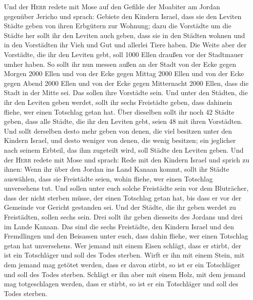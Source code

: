  Und der \textsc{Herr} redete mit Mose auf den Gefilde der
Moabiter am Jordan gegenüber Jericho und sprach:  Gebiete
den Kindern Israel, dass sie den Leviten Städte geben von ihren
Erbgütern zur Wohnung;  dazu die Vorstädte um die Städte
her sollt ihr den Leviten auch geben, dass sie in den Städten wohnen und
in den Vorstädten ihr Vieh und Gut und allerlei Tiere haben.
 Die Weite aber der Vorstädte, die ihr den Leviten gebt,
soll 1000 Ellen draußen vor der Stadtmauer umher haben. 
So sollt ihr nun messen außen an der Stadt von der Ecke gegen Morgen
2000 Ellen und von der Ecke gegen Mittag 2000 Ellen und von der Ecke
gegen Abend 2000 Ellen und von der Ecke gegen Mitternacht 2000 Ellen,
dass die Stadt in der Mitte sei. Das sollen ihre Vorstädte sein.
 Und unter den Städten, die ihr den Leviten geben werdet,
sollt ihr sechs Freistädte geben, dass dahinein fliehe, wer einen
Totschlag getan hat. Über dieselben sollt ihr noch 42 Städte geben,
 dass alle Städte, die ihr den Leviten gebt, seien 48 mit
ihren Vorstädten.  Und sollt derselben desto mehr geben
von denen, die viel besitzen unter den Kindern Israel, und desto weniger
von denen, die wenig besitzen; ein jeglicher nach seinem Erbteil, das
ihm zugeteilt wird, soll Städte den Leviten geben.  Und
der \textsc{Herr} redete mit Mose und sprach:  Rede mit
den Kindern Israel und sprich zu ihnen: Wenn ihr über den Jordan ins
Land Kanaan kommt,  sollt ihr Städte auswählen, dass sie
Freistädte seien, wohin fliehe, wer einen Totschlag unversehens tut.
 Und sollen unter euch solche Freistädte sein vor dem
Bluträcher, dass der nicht sterben müsse, der einen Totschlag getan hat,
bis dass er vor der Gemeinde vor Gericht gestanden sei. 
Und der Städte, die ihr geben werdet zu Freistädten, sollen sechs sein.
 Drei sollt ihr geben diesseits des Jordans und drei im
Lande Kanaan.  Das sind die sechs Freistädte, den Kindern
Israel und den Fremdlingen und den Beisassen unter euch, dass dahin
fliehe, wer einen Totschlag getan hat unversehens.  Wer
jemand mit einem Eisen schlägt, dass er stirbt, der ist ein Totschläger
und soll des Todes sterben.  Wirft er ihn mit einem
Stein, mit dem jemand mag getötet werden, dass er davon stirbt, so ist
er ein Totschläger und soll des Todes sterben.  Schlägt
er ihn aber mit einem Holz, mit dem jemand mag totgeschlagen werden,
dass er stirbt, so ist er ein Totschläger und soll des Todes sterben.

